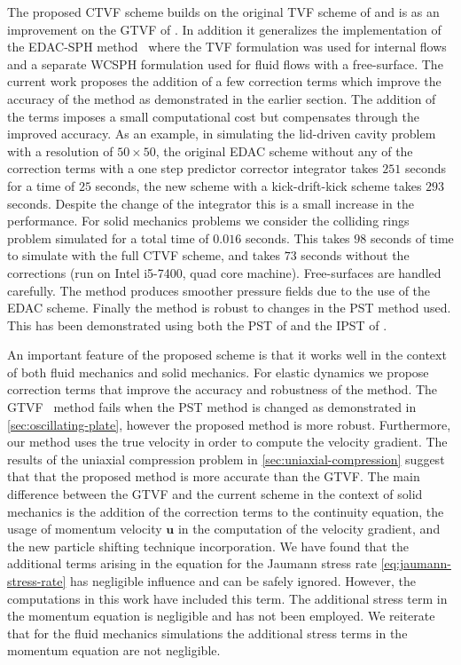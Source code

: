 \documentclass[preprint,12pt]{elsarticle}
\newcommand{\ten}[1]{\ensuremath{\mathbf{#1}}}
\begin{document}
The proposed CTVF scheme builds on the original TVF scheme of
\citet{Adami2013} and is as an improvement on the GTVF of
\citet{zhang_hu_adams17}. In addition it generalizes the implementation of the
EDAC-SPH method~\cite{edac-sph:cf:2019} where the TVF formulation was used for
internal flows and a separate WCSPH formulation used for fluid flows with a
free-surface. The current work proposes the addition of a few correction terms
which improve the accuracy of the method as demonstrated in the earlier
section. The addition of the terms imposes a small computational cost but
compensates through the improved accuracy. As an example, in simulating the
lid-driven cavity problem with a resolution of $50 \times 50$, the original
EDAC scheme without any of the correction terms with a one step predictor
corrector integrator takes $251$ seconds for a time of $25$ seconds, the new
scheme with a kick-drift-kick scheme takes $293$ seconds. Despite the change
of the integrator this is a small increase in the performance. For solid
mechanics problems we consider the colliding rings problem simulated for a
total time of $0.016$ seconds. This takes $98$ seconds of time to simulate
with the full CTVF scheme, and takes $73$ seconds without the corrections (run
on Intel i5-7400, quad core machine). Free-surfaces are handled carefully.
The method produces smoother pressure fields due to the use of the EDAC
scheme. Finally the method is robust to changes in the PST method used. This
has been demonstrated using both the PST of \citet{sun_consistent_2019} and
the IPST of \citet{huang_kernel_2019}.

An important feature of the proposed scheme is that it works well in the
context of both fluid mechanics and solid mechanics. For elastic dynamics we
propose correction terms that improve the accuracy and robustness of the
method. The GTVF~\cite{zhang_hu_adams17} method fails when the PST method is
changed as demonstrated in \cref{sec:oscillating-plate}, however the proposed
method is more robust. Furthermore, our method uses the true velocity in order
to compute the velocity gradient. The results of the uniaxial compression
problem in \cref{sec:uniaxial-compression} suggest that that the proposed
method is more accurate than the GTVF. The main difference between the GTVF
and the current scheme in the context of solid mechanics is the addition of
the correction terms to the continuity equation, the usage of momentum
velocity $\ten{u}$ in the computation of the velocity gradient, and the new
particle shifting technique incorporation. We have found that the additional
terms arising in the equation for the Jaumann stress rate
\cref{eq:jaumann-stress-rate} has negligible influence and can be safely
ignored. However, the computations in this work have included this term. The
additional stress term in the momentum equation is negligible and has not been
employed. We reiterate that for the fluid mechanics simulations the additional
stress terms in the momentum equation are not negligible.
\end{document}
